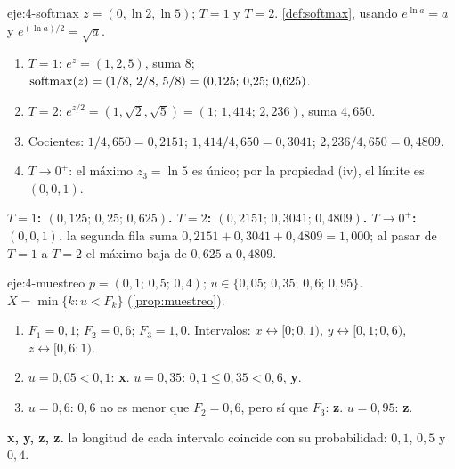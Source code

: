 \begin{solucion}{eje:4-softmax}
\datos $z=(0,\ln 2,\ln 5)$; $T=1$ y $T=2$.
\planteamiento \cref{def:softmax}, usando $e^{\ln a}=a$ y $e^{(\ln a)/2}=\sqrt a$.
\pasos
\begin{enumerate}[label=\arabic*.]
  \item $T=1$: $e^{z}=(1,2,5)$, suma $8$; $\operatorname{softmax}(z)=(1/8,\,2/8,\,5/8)=(0{,}125;\,0{,}25;\,0{,}625)$.
  \item $T=2$: $e^{z/2}=(1,\sqrt2,\sqrt5)=(1;\,1{,}414;\,2{,}236)$, suma $4{,}650$.
  \item Cocientes: $1/4{,}650=0{,}2151$; $1{,}414/4{,}650=0{,}3041$; $2{,}236/4{,}650=0{,}4809$.
  \item $T\to 0^{+}$: el máximo $z_3=\ln 5$ es único; por la propiedad (iv), el límite es $(0,0,1)$.
\end{enumerate}
\resultado \textbf{$T=1$: $(0{,}125;\,0{,}25;\,0{,}625)$. $T=2$: $(0{,}2151;\,0{,}3041;\,0{,}4809)$. $T\to 0^{+}$: $(0,0,1)$.}
\comprobacion la segunda fila suma $0{,}2151+0{,}3041+0{,}4809=1{,}000$; al pasar de $T=1$ a $T=2$ el máximo baja de $0{,}625$ a $0{,}4809$.
\end{solucion}

\begin{solucion}{eje:4-muestreo}
\datos $p=(0{,}1;\,0{,}5;\,0{,}4)$; $u\in\{0{,}05;\,0{,}35;\,0{,}6;\,0{,}95\}$.
\planteamiento $X=\min\{k:u<F_k\}$ (\cref{prop:muestreo}).
\pasos
\begin{enumerate}[label=\arabic*.]
  \item $F_1=0{,}1$; $F_2=0{,}6$; $F_3=1{,}0$. Intervalos: $x\leftrightarrow[0;0{,}1)$, $y\leftrightarrow[0{,}1;0{,}6)$, $z\leftrightarrow[0{,}6;1)$.
  \item $u=0{,}05<0{,}1$: \textbf{x}. $u=0{,}35$: $0{,}1\le 0{,}35<0{,}6$, \textbf{y}.
  \item $u=0{,}6$: $0{,}6$ no es menor que $F_2=0{,}6$, pero sí que $F_3$: \textbf{z}. $u=0{,}95$: \textbf{z}.
\end{enumerate}
\resultado \textbf{x, y, z, z.}
\comprobacion la longitud de cada intervalo coincide con su probabilidad: $0{,}1$, $0{,}5$ y $0{,}4$.
\end{solucion}

